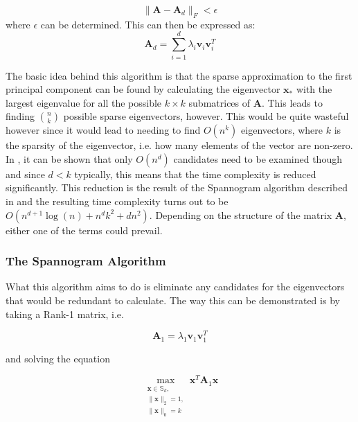 \documentclass[11pt,a4paper]{article}
\begin{document}
\begin{equation*}
\|\mathbf{A} - \mathbf{A}_d\|_F < \epsilon
\end{equation*}
where $\epsilon$ can be determined. This can then be expressed as:
\begin{equation*}
\mathbf{A}_d = \sum_{i=1}^d \lambda_i \mathbf{v}_i \mathbf{v}_i^T
\end{equation*}

The basic idea behind this algorithm is that the sparse approximation to the first principal component can be found by calculating the eigenvector $\mathbf{x}_*$ with the largest eigenvalue for all the possible $k\times k$ submatrices of $\mathbf{A}$. This leads to finding $n \choose k$ possible sparse eigenvectors, however. This would be quite wasteful however since it would lead to needing to find $O\left( n^k\right)$ eigenvectors, where $k$ is the sparsity of the eigenvector, i.e. how many elements of the vector are non-zero. In \cite{dimakis}, it can be shown that only $O\left(n^d\right)$ candidates need to be examined though and since $d < k$ typically, this means that the time complexity is reduced significantly. This reduction is the result of the Spannogram algorithm described in \cite{dimakis} and the resulting time complexity turns out to be $O \left( n^{d+1}\log(n) + n^d k^2 + dn^2\right)$. Depending on the structure of the matrix $\mathbf{A}$, either one of the terms could prevail.

\subsubsection{The Spannogram Algorithm}

What this algorithm aims to do is eliminate any candidates for the eigenvectors that would be redundant to calculate. The way this can be demonstrated is by taking a Rank-1 matrix, i.e.

\begin{equation*}
\mathbf{A}_1 = \lambda_1 \mathbf{v}_1 \mathbf{v}_1^T
\end{equation*}

and solving the equation

\begin{equation*}
\max_{\substack{\mathbf{x} \in\mathbb{S}_k, \\ \|\mathbf{x}\|_2 = 1, \\ \|\mathbf{x}\|_0 = k}} \mathbf{x}^T\mathbf{A}_1\mathbf{x}
\end{equation*}
\end{document}

